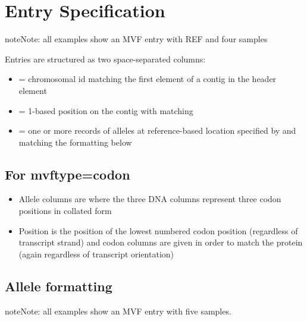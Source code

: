 \documentclass[letterpaper,11pt,english]{sphinxmanual}
\begin{document}
\section{Entry Specification}
\label{\detokenize{mvf_spec:entry-specification}}
\begin{sphinxadmonition}{note}{Note:}
all examples show an MVF entry with REF and four samples
\end{sphinxadmonition}

Entries are structured as two space-separated columns:

\begin{itemize}
\item {} 
 = chromosomal id matching the first element of a contig in the  header element

\item {} 
 = 1-based position on the contig with matching 

\item {} 
 = one or more records of alleles at reference-based location specified by  and matching the formatting below

\end{itemize}


\subsection{For mvftype=codon}
\label{\detokenize{mvf_spec:for-mvftype-codon}}\begin{itemize}
\item {} 
Allele columns are  where the three DNA columns represent three codon positions in collated form

\item {} 
Position is the position of the lowest numbered codon position (regardless of transcript strand) and  codon columns are given in order to match the protein (again regardless of transcript orientation)

\end{itemize}


\subsection{Allele formatting}
\label{\detokenize{mvf_spec:allele-formatting}}
\begin{sphinxadmonition}{note}{Note:}
all examples show an MVF entry with five samples.
\end{sphinxadmonition}
\end{document}
